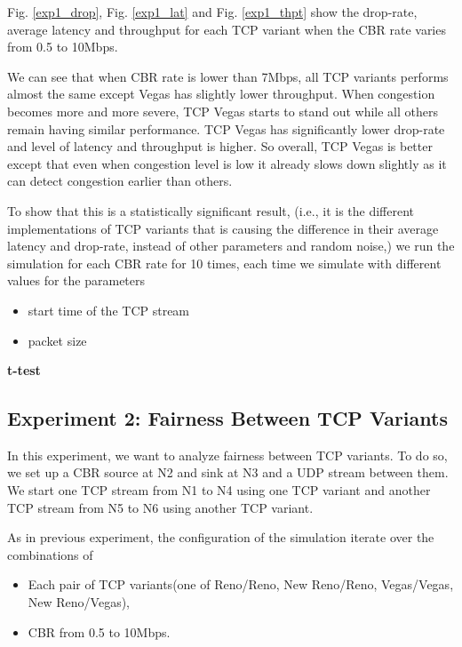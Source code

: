 \documentclass[10pt, conference]{IEEEtran/IEEEtran}
\begin{document}
Fig. \ref{exp1_drop}, Fig. \ref{exp1_lat} and Fig. \ref{exp1_thpt} show the drop-rate, average latency and throughput for each TCP variant when the CBR rate varies from 0.5 to 10Mbps. 

We can see that when CBR rate is lower than 7Mbps, all TCP variants performs almost the same except Vegas has slightly lower throughput. When congestion becomes more and more severe, TCP Vegas starts to stand out while all others remain having similar performance. TCP Vegas has significantly lower drop-rate and level of latency and throughput is higher. So overall, TCP Vegas is better except that even when congestion level is low it already slows down slightly as it can detect congestion earlier than others\cite{vegas}.

To show that this is a statistically significant result, (i.e., it is the different implementations of TCP variants that is causing the difference in their average latency and drop-rate, instead of other parameters and random noise,) we run the simulation for each CBR rate for 10 times, each time we simulate with different values for the parameters

\begin{itemize}
\item start time of the TCP stream
\item packet size
\end{itemize}

\textbf{t-test}


\subsection{Experiment 2: Fairness Between TCP Variants}

In this experiment, we want to analyze fairness between TCP variants. To do so, we set up a CBR source at N2 and sink at N3 and a UDP stream between them. We start one TCP stream from N1 to N4 using one TCP
variant and another TCP stream from N5 to N6 using another TCP variant.

As in previous experiment, the configuration of the simulation iterate over the combinations of 
\begin{itemize}
\item Each pair of TCP variants(one of Reno/Reno, New Reno/Reno, Vegas/Vegas,
New Reno/Vegas), 
\item CBR from 0.5 to 10Mbps.
\end{itemize}

\end{document}
